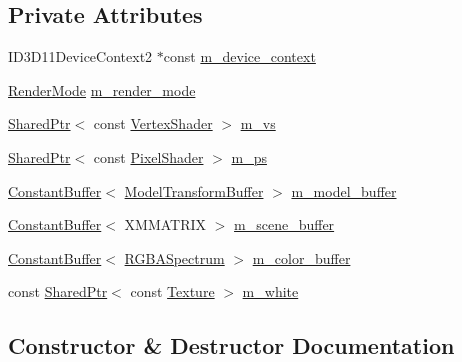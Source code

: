 \subsection*{Private Attributes}
\begin{DoxyCompactItemize}
\item 
I\+D3\+D11\+Device\+Context2 $\ast$const \hyperlink{classmage_1_1_variable_component_pass_a12a0f59a371c46377af9032744a6e71b}{m\+\_\+device\+\_\+context}
\item 
\hyperlink{namespacemage_a5e7e18b0154373ce8fc942fe3f6b27fd}{Render\+Mode} \hyperlink{classmage_1_1_variable_component_pass_a6e9a67c5251951f887d64c1a6d50a33c}{m\+\_\+render\+\_\+mode}
\item 
\hyperlink{namespacemage_a1e01ae66713838a7a67d30e44c67703e}{Shared\+Ptr}$<$ const \hyperlink{classmage_1_1_vertex_shader}{Vertex\+Shader} $>$ \hyperlink{classmage_1_1_variable_component_pass_afc290392240d6e9af2ba3027b992f53d}{m\+\_\+vs}
\item 
\hyperlink{namespacemage_a1e01ae66713838a7a67d30e44c67703e}{Shared\+Ptr}$<$ const \hyperlink{namespacemage_ac98506b7edd999ea43ec46fbd0330238}{Pixel\+Shader} $>$ \hyperlink{classmage_1_1_variable_component_pass_a20d7e3c6b663544b84871f519284db2c}{m\+\_\+ps}
\item 
\hyperlink{structmage_1_1_constant_buffer}{Constant\+Buffer}$<$ \hyperlink{structmage_1_1_model_transform_buffer}{Model\+Transform\+Buffer} $>$ \hyperlink{classmage_1_1_variable_component_pass_a3313fa671047d02a9c9b85fea85f545d}{m\+\_\+model\+\_\+buffer}
\item 
\hyperlink{structmage_1_1_constant_buffer}{Constant\+Buffer}$<$ X\+M\+M\+A\+T\+R\+IX $>$ \hyperlink{classmage_1_1_variable_component_pass_aea22dab8a860f5b3cfa85ee38bc39190}{m\+\_\+scene\+\_\+buffer}
\item 
\hyperlink{structmage_1_1_constant_buffer}{Constant\+Buffer}$<$ \hyperlink{structmage_1_1_r_g_b_a_spectrum}{R\+G\+B\+A\+Spectrum} $>$ \hyperlink{classmage_1_1_variable_component_pass_a5ad5ee6588063683cacf4ad3aac055bc}{m\+\_\+color\+\_\+buffer}
\item 
const \hyperlink{namespacemage_a1e01ae66713838a7a67d30e44c67703e}{Shared\+Ptr}$<$ const \hyperlink{classmage_1_1_texture}{Texture} $>$ \hyperlink{classmage_1_1_variable_component_pass_a2b018f6481e6e5aa043223ce6821725d}{m\+\_\+white}
\end{DoxyCompactItemize}


\subsection{Constructor \& Destructor Documentation}
\hypertarget{classmage_1_1_variable_component_pass_a86224a1702761665451b3c6e78557261}{}\label{classmage_1_1_variable_component_pass_a86224a1702761665451b3c6e78557261} 

